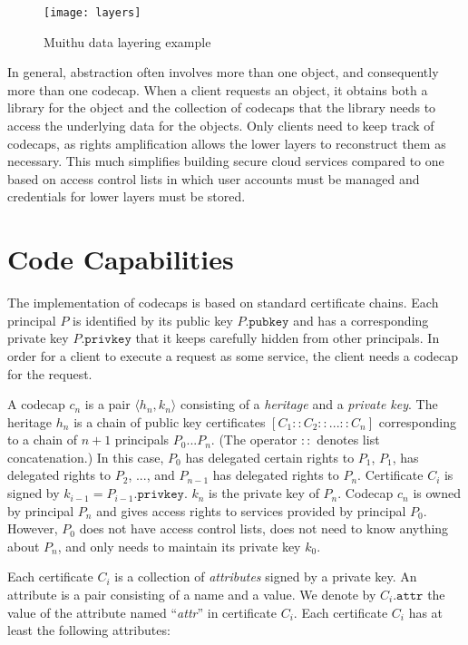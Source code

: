 \documentclass[10pt, conference, compsocconf]{IEEEtran}
\newcommand{\pr}[1]{\langle #1 \rangle}
\begin{document}
\begin{figure}
\texttt{[image: layers]}
\caption{Muithu data layering example}
\label{fig:muithu}
\end{figure}


In general, abstraction often involves more than one object, and
consequently more than one codecap.  When a client requests an
object, it obtains both a library for the object and the collection
of codecaps that the library needs to access the underlying data
for the objects.  Only clients need to keep track of codecaps, as
rights amplification allows the lower layers to reconstruct them
as necessary.  This much simplifies building secure cloud services
compared to one based on access control lists in which user accounts
must be managed and credentials for lower layers must be stored.



\section{Code Capabilities}

The implementation of codecaps is based on standard
certificate chains.
Each principal $P$
is identified by its public key $P.\texttt{pubkey}$
and has a corresponding private key $P.\texttt{privkey}$
that it keeps carefully hidden from other principals.
In order for a client
to execute a request as some service, the client needs
a codecap for the request.

A codecap $c_n$ is a pair $\pr{h_n, k_n}$ consisting of a
\emph{heritage} and a \emph{private key}.
The heritage $h_n$ is a chain of public
key certificates $[ C_1 :: C_2 :: ... :: C_n ]$ corresponding to a
chain of $n+1$ principals $P_0 ... P_n$.
(The operator $::$ denotes list concatenation.)
In this case, $P_0$ has delegated certain rights to $P_1$, $P_1$,
has delegated rights to $P_2$, ..., and $P_{n-1}$ has
delegated rights to $P_n$.
Certificate $C_i$ is
signed by $k_{i-1} = P_{i-1}.\texttt{privkey}$.
$k_n$ is the private key of $P_n$.
Codecap $c_n$ is owned by principal $P_n$ and gives access
rights to services provided by principal $P_0$.
However, $P_0$ does not have access control lists, does not need to
know anything about $P_n$, and only needs to maintain its private
key $k_0$.

Each certificate $C_i$ is a collection of \emph{attributes} signed
by a private key.  An
attribute is a pair consisting of a name and a value.
We denote by $C_i.\texttt{attr}$ the value of the
attribute named ``\textit{attr}'' in certificate $C_i$.
Each certificate $C_i$ has at least the following attributes:
\end{document}
